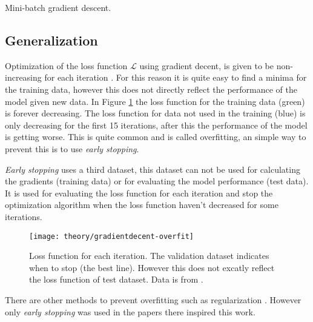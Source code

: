 \begin{algorithm}[h]
 \DontPrintSemicolon
 \caption{Mini-batch gradient descent.}
 \label{algorithm:gradientdecent:mini-batch}
\end{algorithm}

\subsection{Generalization}

Optimization of the loss function $\mathcal{L}$ using gradient decent, is given to be non-increasing for each iteration \cite{bishop}. For this reason it is quite easy to find a minima for the training data, however this does not directly reflect the performance of the model given new data. In Figure \ref{fig:theory:gradientdecent:overfit} the loss function for the training data (green) is forever decreasing. The loss function for data not used in the training (blue) is only decreasing for the first 15 iterations, after this the performance of the model is getting worse. This is quite common and is called overfitting, an simple way to prevent this is to use \textit{early stopping}.

\textit{Early stopping} uses a third dataset, this dataset can not be used for calculating the gradients (training data) or for evaluating the model performance (test data). It is used for evaluating the loss function for each iteration and stop the optimization algorithm when the loss function haven't decreased for some iterations. \cite{the-elements-of-statistical-learning, bishop, alexgraves}

\begin{figure}[h]
	\centering
	\texttt{[image: theory/gradientdecent-overfit]}
	\caption{Loss function for each iteration. The validation dataset indicates when to stop (the best line). However this does not excatly reflect the loss function of test dataset. Data is from \cite{alexgraves}.}
	\label{fig:theory:gradientdecent:overfit}
\end{figure}

There are other methods to prevent overfitting such as regularization \cite{the-elements-of-statistical-learning, bishop}. However only \textit{early stopping} was used in the papers there inspired this work.
